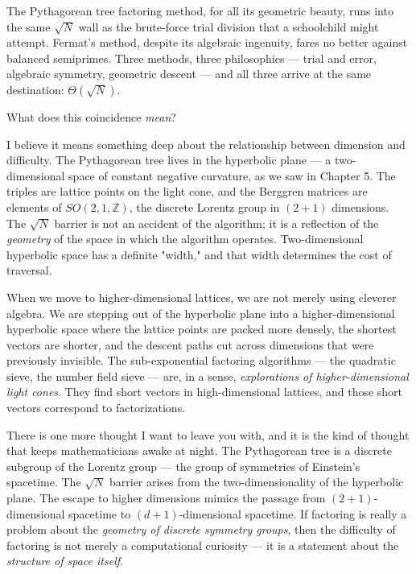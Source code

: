 The Pythagorean tree factoring method, for all its geometric beauty, runs into the same $\sqrt{N}$ wall as the brute-force trial division that a schoolchild might attempt. Fermat's method, despite its algebraic ingenuity, fares no better against balanced semiprimes. Three methods, three philosophies --- trial and error, algebraic symmetry, geometric descent --- and all three arrive at the same destination: $\Theta(\sqrt{N})$.

What does this coincidence \textit{mean}?

I believe it means something deep about the relationship between dimension and difficulty. The Pythagorean tree lives in the hyperbolic plane --- a two-dimensional space of constant negative curvature, as we saw in Chapter 5. The triples are lattice points on the light cone, and the Berggren matrices are elements of $SO(2, 1, \mathbb{Z})$, the discrete Lorentz group in $(2+1)$ dimensions. The $\sqrt{N}$ barrier is not an accident of the algorithm; it is a reflection of the \textit{geometry} of the space in which the algorithm operates. Two-dimensional hyperbolic space has a definite "width," and that width determines the cost of traversal.

When we move to higher-dimensional lattices, we are not merely using cleverer algebra. We are stepping out of the hyperbolic plane into a higher-dimensional hyperbolic space where the lattice points are packed more densely, the shortest vectors are shorter, and the descent paths cut across dimensions that were previously invisible. The sub-exponential factoring algorithms --- the quadratic sieve, the number field sieve --- are, in a sense, \textit{explorations of higher-dimensional light cones}. They find short vectors in high-dimensional lattices, and those short vectors correspond to factorizations.

There is one more thought I want to leave you with, and it is the kind of thought that keeps mathematicians awake at night. The Pythagorean tree is a discrete subgroup of the Lorentz group --- the group of symmetries of Einstein's spacetime. The $\sqrt{N}$ barrier arises from the two-dimensionality of the hyperbolic plane. The escape to higher dimensions mimics the passage from $(2+1)$-dimensional spacetime to $(d+1)$-dimensional spacetime. If factoring is really a problem about the \textit{geometry of discrete symmetry groups}, then the difficulty of factoring is not merely a computational curiosity --- it is a statement about the \textit{structure of space itself}.

